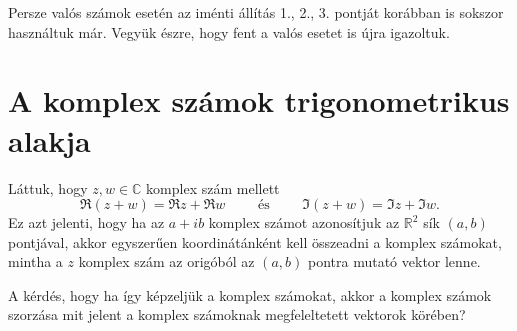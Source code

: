 \documentclass[a4paper, showtrims]{memoir}
\theoremstyle{plain}
\theoremstyle{remark}
\theoremstyle{definition}
\begin{document}
Persze valós számok esetén az iménti állítás 1., 2., 3. pontját korábban is sokszor használtuk már.
Vegyük észre, hogy fent a valós esetet is újra igazoltuk.

\section{A komplex számok trigonometrikus alakja}
Láttuk, hogy $z,w\in\mathbb{C}$ komplex szám mellett
\[
	\Re\left( z+w \right)=\Re z+\Re w
	\qquad
	\text{ és }
	\qquad
	\Im\left( z+w \right)=\Im z+\Im w.
\]
Ez azt jelenti, hogy ha az $a+ib$ komplex számot azonosítjuk az $\mathbb{R}^2$ sík
$\left( a,b \right)$ pontjával,
akkor egyszerűen koordinátánként kell összeadni a komplex számokat, mintha a $z$ komplex szám
az origóból az $\left( a,b \right)$ pontra mutató vektor lenne.

A kérdés, hogy ha így képzeljük a komplex számokat,
akkor a komplex számok szorzása mit jelent a komplex számoknak megfeleltetett vektorok körében?
\end{document}
